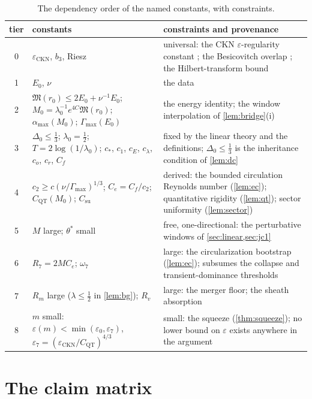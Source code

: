 \documentclass[11pt,letterpaper]{amsart}
\theoremstyle{definition}
\theoremstyle{remark}
\newcommand{\om}{\omega}
\begin{document}
\begin{table}[H]
\centering\small
\begin{tabular}{@{}cp{}p{}@{}}
\toprule
tier & constants & constraints and provenance \\
\midrule
0 & $\varepsilon_{\mathrm{CKN}}$, $b_3$, Riesz & universal: the CKN
$\varepsilon$-regularity constant \cite{CKN1982,Lin1998}; the Besicovitch overlap
\cite{Mattila1995}; the Hilbert-transform bound \\
1 & $E_0$, $\nu$ & the data \\
2 & $\mathfrak{M}(r_0)\le2E_0+\nu^{-1}E_0$;\; $M_0=\lambda_0^{-1}e^{4C}\mathfrak{M}(r_0)$;\;
$\alpha_{\max}(M_0)$;\; $\Gamma_{\max}(E_0)$ & the energy identity; the window
interpolation of \cref{lem:bridge}\textup{(i)} \\
3 & $\Delta_0\le\tfrac13$; $\lambda_0=\tfrac12$; $T=2\log(1/\lambda_0)$; $c_*$,
$c_1$, $c_E$, $c_\lambda$, $c_o$, $c_r$, $C_f$ & fixed by the linear theory and the
definitions; $\Delta_0\le\tfrac13$ is the inheritance condition of \cref{lem:dc} \\
4 & $c_2\ge c(\nu/\Gamma_{\max})^{1/3}$; $C_e=C_f/c_2$; $C_{\mathrm{QT}}(M_0)$;
$C_{\mathrm{su}}$ & derived: the bounded circulation Reynolds number
(\cref{lem:ec}); quantitative rigidity (\cref{lem:qt}); sector uniformity
(\cref{lem:sector}) \\
5 & $M$ large; $\theta^*$ small & free, one-directional: the perturbative windows of
\cref{sec:linear,sec:jc1} \\
6 & $R_7=2MC_e$; $\om_7$ & large: the circularization bootstrap (\cref{lem:ec});
subsumes the collapse and transient-dominance thresholds \\
7 & $R_m$ large ($\lambda\le\tfrac12$ in \cref{lem:bg}); $R_v$ & large: the
merger floor; the sheath absorption \\
8 & $m$ small: $\varepsilon(m)<\min(\varepsilon_0,\varepsilon_7)$,\;
$\varepsilon_7=(\varepsilon_{\mathrm{CKN}}/C_{\mathrm{QT}})^{4/3}$ & small: the
squeeze (\cref{thm:squeeze}); no lower bound on $\varepsilon$ exists anywhere in the
argument \\
\bottomrule
\end{tabular}
\caption{The dependency order of the named constants, with constraints.}
\label{tab:constantsfull}
\end{table}

\section{The claim matrix}\label{app:matrix}
\end{document}
